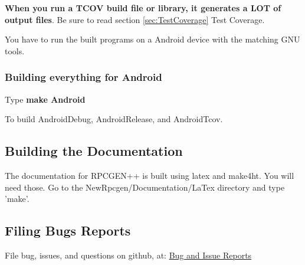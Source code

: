 \textbf{When you run a TCOV build file or library, it generates a LOT of  output files}. Be sure to read section \ref{sec:TestCoverage}{ Test Coverage}.

You have to run the built programs on a Android device
with the matching GNU tools.
  
\subsubsection{Building everything for Android}
Type \textbf{make Android}

To build AndroidDebug, AndroidRelease, and AndroidTcov.

\subsection{Building the Documentation}
The documentation for RPCGEN++ is built using latex and make4ht.
You will need those.
Go to the NewRpcgen/Documentation/LaTex directory
and type 'make'.

\subsection{Filing Bugs Reports}
File bug, issues, and questions on github, at:
\href {https://github.com/RiverExplorer/Phoenix/issues}{Bug and Issue Reports}
